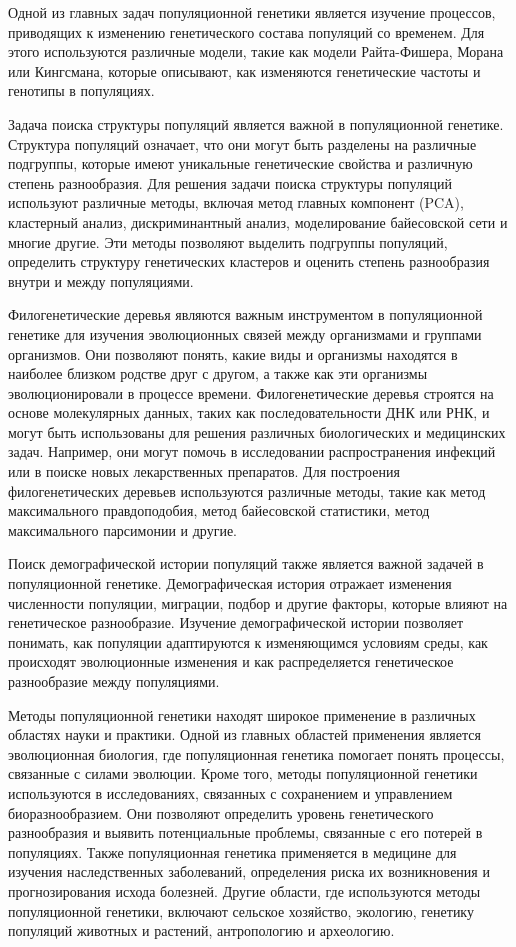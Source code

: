 Одной из главных задач популяционной генетики является изучение процессов, приводящих к изменению генетического состава популяций со временем. Для этого используются различные модели, такие как модели Райта-Фишера, Морана или Кингсмана, которые описывают, как изменяются генетические частоты и генотипы в популяциях.

Задача поиска структуры популяций является важной в популяционной генетике.
Структура популяций означает, что они могут быть разделены на различные подгруппы, которые имеют уникальные генетические свойства и различную степень разнообразия.
Для решения задачи поиска структуры популяций используют различные методы, включая метод главных компонент (PCA), кластерный анализ, дискриминантный анализ, моделирование байесовской сети и многие другие. Эти методы позволяют выделить подгруппы популяций, определить структуру генетических кластеров и оценить степень разнообразия внутри и между популяциями.

Филогенетические деревья являются важным инструментом в популяционной генетике для изучения эволюционных связей между организмами и группами организмов. 
Они позволяют понять, какие виды и организмы находятся в наиболее близком родстве друг с другом, а также как эти организмы эволюционировали в процессе времени. 
Филогенетические деревья строятся на основе молекулярных данных, таких как последовательности ДНК или РНК, и могут быть использованы для решения различных биологических и медицинских задач. 
Например, они могут помочь в исследовании распространения инфекций или в поиске новых лекарственных препаратов.
Для построения филогенетических деревьев используются различные методы, такие как метод максимального правдоподобия, метод байесовской статистики, метод максимального парсимонии и другие.

Поиск демографической истории популяций также является важной задачей в популяционной генетике. 
Демографическая история отражает изменения численности популяции, миграции, подбор и другие факторы, которые влияют на генетическое разнообразие.
Изучение демографической истории позволяет понимать, как популяции адаптируются к изменяющимся условиям среды, как происходят эволюционные изменения и как распределяется генетическое разнообразие между популяциями.

Методы популяционной генетики находят широкое применение в различных областях науки и практики. 
Одной из главных областей применения является эволюционная биология, где популяционная генетика помогает понять процессы, связанные с силами эволюции.
Кроме того, методы популяционной генетики используются в исследованиях, связанных с сохранением и управлением биоразнообразием.
Они позволяют определить уровень генетического разнообразия и выявить потенциальные проблемы, связанные с его потерей в популяциях.
Также популяционная генетика применяется в медицине для изучения наследственных заболеваний, определения риска их возникновения и прогнозирования исхода болезней.
Другие области, где используются методы популяционной генетики, включают сельское хозяйство, экологию, генетику популяций животных и растений, антропологию и археологию.

